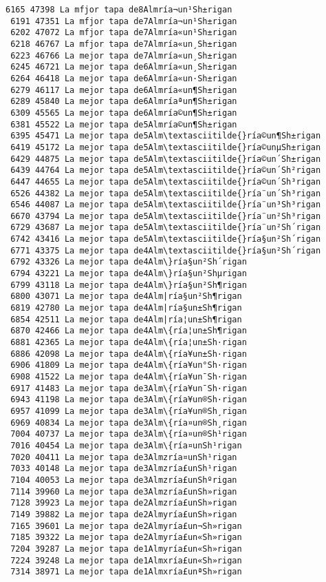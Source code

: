 \documentclass[11pt]{article}
\begin{document}
\begin{Verbatim}[commandchars=\\\{\}]
 6165 47398 La mfjor tapa de8Almría¬un¹Sh±rigan
 6191 47351 La mfjor tapa de7Almría¬un¹Sh±rigan
 6202 47072 La mfjor tapa de7Almría«un¹Sh±rigan
 6218 46767 La mfjor tapa de7Almría«un¸Sh±rigan
 6223 46766 La mejor tapa de7Almría«un¸Sh±rigan
 6245 46721 La mejor tapa de6Almría«un¸Sh±rigan
 6264 46418 La mejor tapa de6Almría«un·Sh±rigan
 6279 46117 La mejor tapa de6Almría«un¶Sh±rigan
 6289 45840 La mejor tapa de6Almríaªun¶Sh±rigan
 6309 45565 La mejor tapa de6Almría©un¶Sh±rigan
 6381 45522 La mejor tapa de5Almría©un¶Sh±rigan
 6395 45471 La mejor tapa de5Alm\textasciitilde{}ría©un¶Sh±rigan
 6419 45172 La mejor tapa de5Alm\textasciitilde{}ría©unµSh±rigan
 6429 44875 La mejor tapa de5Alm\textasciitilde{}ría©un´Sh±rigan
 6439 44764 La mejor tapa de5Alm\textasciitilde{}ría©un´Sh²rigan
 6447 44655 La mejor tapa de5Alm\textasciitilde{}ría©un´Sh³rigan
 6526 44382 La mejor tapa de5Alm\textasciitilde{}ría¨un´Sh³rigan
 6546 44087 La mejor tapa de5Alm\textasciitilde{}ría¨un³Sh³rigan
 6670 43794 La mejor tapa de5Alm\textasciitilde{}ría¨un²Sh³rigan
 6729 43687 La mejor tapa de5Alm\textasciitilde{}ría¨un²Sh´rigan
 6742 43416 La mejor tapa de5Alm\textasciitilde{}ría§un²Sh´rigan
 6771 43375 La mejor tapa de4Alm\textasciitilde{}ría§un²Sh´rigan
 6792 43326 La mejor tapa de4Alm\}ría§un²Sh´rigan
 6794 43221 La mejor tapa de4Alm\}ría§un²Shµrigan
 6799 43118 La mejor tapa de4Alm\}ría§un²Sh¶rigan
 6800 43071 La mejor tapa de4Alm|ría§un²Sh¶rigan
 6819 42780 La mejor tapa de4Alm|ría§un±Sh¶rigan
 6854 42511 La mejor tapa de4Alm|ría¦un±Sh¶rigan
 6870 42466 La mejor tapa de4Alm\{ría¦un±Sh¶rigan
 6881 42365 La mejor tapa de4Alm\{ría¦un±Sh·rigan
 6886 42098 La mejor tapa de4Alm\{ría¥un±Sh·rigan
 6906 41809 La mejor tapa de4Alm\{ría¥un°Sh·rigan
 6908 41522 La mejor tapa de4Alm\{ría¥un¯Sh·rigan
 6917 41483 La mejor tapa de3Alm\{ría¥un¯Sh·rigan
 6943 41198 La mejor tapa de3Alm\{ría¥un®Sh·rigan
 6957 41099 La mejor tapa de3Alm\{ría¥un®Sh¸rigan
 6969 40834 La mejor tapa de3Alm\{ría¤un®Sh¸rigan
 7004 40737 La mejor tapa de3Alm\{ría¤un®Sh¹rigan
 7016 40454 La mejor tapa de3Alm\{ría¤un­Sh¹rigan
 7020 40411 La mejor tapa de3Almzría¤un­Sh¹rigan
 7033 40148 La mejor tapa de3Almzría£un­Sh¹rigan
 7104 40053 La mejor tapa de3Almzría£un­Shºrigan
 7114 39960 La mejor tapa de3Almzría£un­Sh»rigan
 7128 39923 La mejor tapa de2Almzría£un­Sh»rigan
 7149 39882 La mejor tapa de2Almyría£un­Sh»rigan
 7165 39601 La mejor tapa de2Almyría£un¬Sh»rigan
 7185 39322 La mejor tapa de2Almyría£un«Sh»rigan
 7204 39287 La mejor tapa de1Almyría£un«Sh»rigan
 7224 39248 La mejor tapa de1Almxría£un«Sh»rigan
 7314 38971 La mejor tapa de1Almxría£unªSh»rigan

\end{Verbatim}
\end{document}
